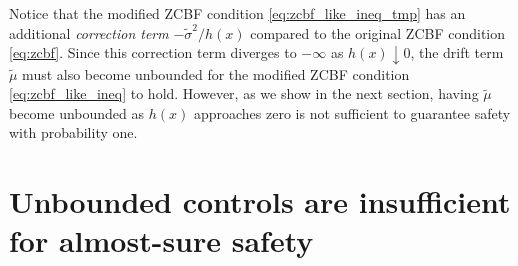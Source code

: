 \documentclass[twocolumn,amsthm]{autart}
\begin{document}
Notice that the modified ZCBF condition \eqref{eq:zcbf_like_ineq_tmp} has an additional \textit{correction term} $-\tilde{\sigma}^2 / h(x)$ compared to the original ZCBF condition \eqref{eq:zcbf}. Since this correction term diverges to $-\infty$ as $h(x) \downarrow 0$, the drift term $\tilde{\mu}$ must also become unbounded for the modified ZCBF condition \eqref{eq:zcbf_like_ineq} to hold. However, as we show in the next section, having $\tilde{\mu}$ become unbounded as $h(x)$ approaches zero is not sufficient to guarantee safety with probability one.

\section{Unbounded controls are insufficient for almost-sure safety}
\end{document}
